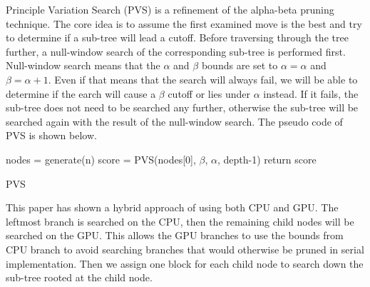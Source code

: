 \noindent
Principle Variation Search (PVS) \cite{pvs} is a refinement of the alpha-beta pruning technique. The core idea is to assume the first examined move is the best and try to determine if a sub-tree will lead a cutoff. Before traversing through the tree further, a null-window search of the corresponding sub-tree is performed first. Null-window search means that the $\alpha$ and $\beta$ bounds are set to $\alpha = \alpha$ and $\beta = \alpha + 1$. Even if that means that the search will always fail, we will be able to determine if the earch will cause a $\beta$ cutoff or lies under $\alpha$ instead. If it fails, the sub-tree does not need to be searched any further, otherwise the sub-tree will be searched again with the result of the null-window search. The pseudo code of PVS is shown below.\\

\begin{algorithm}[!htbp]
\SetAlgoLined
{}
nodes = generate(n)\;
score = PVS(nodes[0], $\beta$, $\alpha$, depth-1)\;
return score\;
\caption{PVS}
\label{alg:PVS}
\end{algorithm}

\noindent
This paper \cite{pvsgpu} has shown a hybrid approach of using both CPU and GPU. The leftmost branch is searched on the CPU, then the remaining child nodes will be searched on the GPU. This allows the GPU branches to use the bounds from CPU branch to avoid searching branches that would otherwise be pruned in serial implementation. Then we assign one block for each child node to search down the sub-tree rooted at the child node.\\

